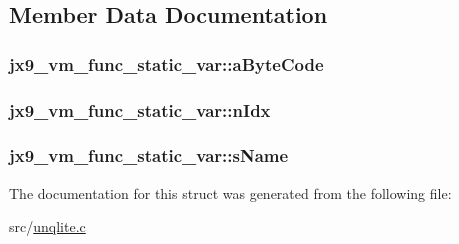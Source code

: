 \subsection{Member Data Documentation}
\hypertarget{structjx9__vm__func__static__var_a2fb6d9d63e7eed7f0ae01cdf492c0ef0}{
\subsubsection[{a\-Byte\-Code}]{ jx9\-\_\-vm\-\_\-func\-\_\-static\-\_\-var\-::a\-Byte\-Code}}\label{d5/d98/structjx9__vm__func__static__var_a2fb6d9d63e7eed7f0ae01cdf492c0ef0}
\hypertarget{structjx9__vm__func__static__var_a334cff471909616b3e6b075f86ad1186}{
\subsubsection[{n\-Idx}]{ jx9\-\_\-vm\-\_\-func\-\_\-static\-\_\-var\-::n\-Idx}}\label{d5/d98/structjx9__vm__func__static__var_a334cff471909616b3e6b075f86ad1186}
\hypertarget{structjx9__vm__func__static__var_ad69869623f21073acc50a331eaa6de0c}{
\subsubsection[{s\-Name}]{ jx9\-\_\-vm\-\_\-func\-\_\-static\-\_\-var\-::s\-Name}}\label{d5/d98/structjx9__vm__func__static__var_ad69869623f21073acc50a331eaa6de0c}


The documentation for this struct was generated from the following file\-:\begin{DoxyCompactItemize}
\item 
src/\hyperlink{unqlite_8c}{unqlite.\-c}\end{DoxyCompactItemize}
